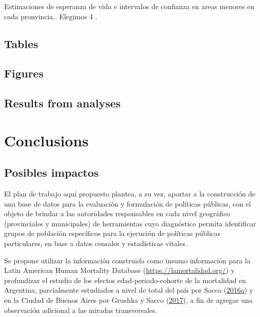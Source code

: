 \documentclass[12pt,spanish,]{article}
\begin{document}
Estimaciones de esperanza de vida e intervalos de confianza en areas
menores en cada pronvincia.. Elegimos 4 .

\hypertarget{tables}{%
\subsection{Tables}\label{tables}}

\hypertarget{figures}{%
\subsection{Figures}\label{figures}}

\hypertarget{results-from-analyses}{%
\subsection{Results from analyses}\label{results-from-analyses}}

\hypertarget{conclusions}{%
\section{Conclusions}\label{conclusions}}

\hypertarget{posibles-impactos}{%
\subsection{Posibles impactos}\label{posibles-impactos}}

El plan de trabajo aquí propuesto plantea, a su vez, aportar a la
construcción de una base de datos para la evaluación y formulación de
políticas públicas, con el objeto de brindar a las autoridades
responsables en cada nivel geográfico (provinciales y municipales) de
herramientas cuyo diagnóstico permita identificar grupos de población
específicos para la ejecución de políticas públicas particulares, en
base a datos censales y estadísticas vitales.

Se propone utilizar la información construida como insumo información
para la Latin American Human Mortality Database
(\url{https://lamortalidad.org/}) y profundizar el estudio de los
efectos edad-periodo-cohorte de la mortalidad en Argentina, parcialmente
estudiados a nivel de total del país por Sacco
(\protect\hyperlink{ref-Sacco2016}{2016}\protect\hyperlink{ref-Sacco2016}{a})
y en la Ciudad de Buenos Aires por Grushka y Sacco
(\protect\hyperlink{ref-GrushkaSacco2017}{2017}), a fin de agregar una
observación adicional a las miradas transversales.
\end{document}
